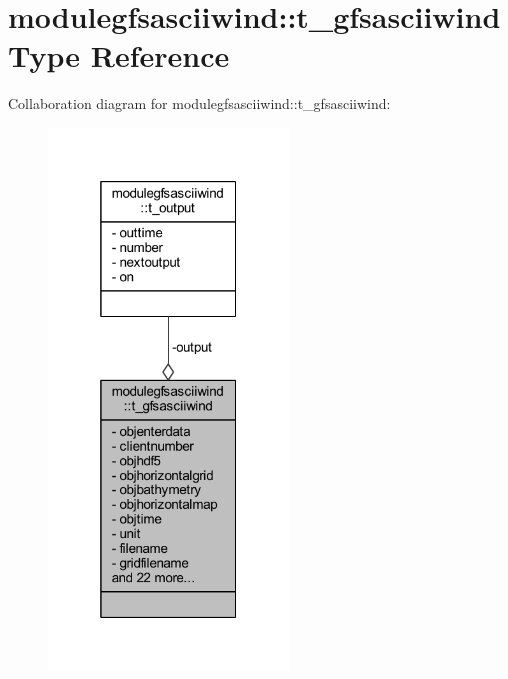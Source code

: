 \hypertarget{structmodulegfsasciiwind_1_1t__gfsasciiwind}{}\section{modulegfsasciiwind\+:\+:t\+\_\+gfsasciiwind Type Reference}
\label{structmodulegfsasciiwind_1_1t__gfsasciiwind}


Collaboration diagram for modulegfsasciiwind\+:\+:t\+\_\+gfsasciiwind\+:\nopagebreak
\begin{figure}[H]
\begin{center}
\leavevmode
\includegraphics[width=181pt]{structmodulegfsasciiwind_1_1t__gfsasciiwind__coll__graph}
\end{center}
\end{figure}
